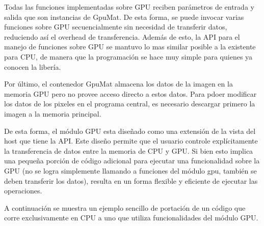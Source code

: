 \documentclass[a4paper,10pt]{report}
\begin{document}
Todas las funciones implementadas sobre GPU reciben parámetros de entrada y salida que son instancias de GpuMat. De esta forma, se puede invocar varias funciones sobre GPU secuencialmente sin necesidad de transferir datos, reduciendo así el overhead de transferencia.
Además de esto, la API para el manejo de funciones sobre GPU se mantuvo lo mas similar posible a la existente para CPU, de manera que la programación se hace muy simple para quienes ya conocen la libería.

Por último, el contenedor GpuMat almacena los datos de la imagen en la memoria GPU pero no provee acceso directo a estos datos. Para pdoer modificar los datos de los pixeles en el programa central, es necesario descargar primero la imagen a la memoria principal.

De esta forma, el módulo GPU esta diseñado como una extensión de la vista del host que tiene la API. Este diseño permite que el usuario controle explícitamente la transferencia de datos entre la memoria de CPU y GPU.
Si bien esto implica una pequeña porción de código adicional para ejecutar una funcionalidad sobre la GPU (no se logra simplemente llamando a funciones del módulo gpu, también se deben transferir los datos), resulta en un forma flexible y eficiente de ejecutar las operaciones. 


A continuación se muestra un ejemplo sencillo de portación de un código que corre exclusivamente en CPU a uno que utiliza funcionalidades del módulo GPU.
\end{document}
